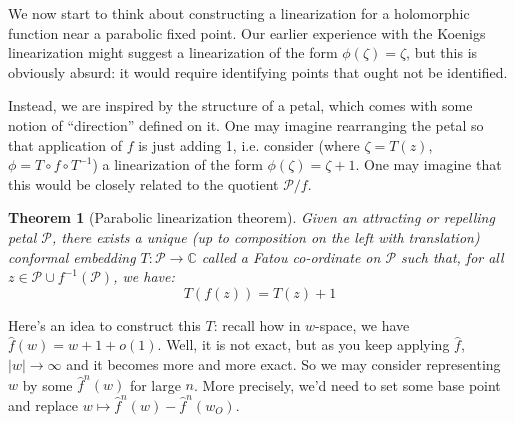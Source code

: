 \documentclass{article}
\newtheorem{thm}{Theorem}
\begin{document}
We now start to think about constructing a linearization for a holomorphic function near a parabolic fixed point. Our earlier experience with the Koenigs linearization might suggest a linearization of the form $\phi(\zeta)=\zeta$, but this is obviously absurd: it would require identifying points that ought not be identified. 

Instead, we are inspired by the structure of a petal, which comes with some notion of ``direction'' defined on it. One may imagine rearranging the petal so that application of $f$ is just adding 1, i.e. consider (where $\zeta=T(z)$, $\phi=T\circ f\circ T^{-1}$) a linearization of the form $\phi(\zeta)=\zeta+1$. One may imagine that this would be closely related to the quotient $\mathcal{P}/f$. 

\begin{thm}[Parabolic linearization theorem]
    \label{thm:linear}
    Given an attracting or repelling petal $\mathcal{P}$, there exists a unique (up to composition on the left with translation) conformal embedding $T:\mathcal{P}\to\mathbb{C}$ called a Fatou co-ordinate on $\mathcal{P}$ such that, for all $z\in\mathcal{P}\cup f^{-1}(\mathcal{P})$, we have:
    \begin{equation*}
        T(f(z))=T(z)+1
    \end{equation*}
\end{thm}

Here's an idea to construct this $T$: recall how in $w$-space, we have $\hat{f}(w) = w + 1 + o(1)$. Well, it is not exact, but as you keep applying $\hat{f}$, $|w|\to\infty$ and it becomes more and more exact. So we may consider representing $w$ by some $\hat{f}^n(w)$ for large $n$. More precisely, we'd need to set some base point and replace $w\mapsto \hat{f}^n(w)-\hat{f}^n(w_O)$.
\end{document}
